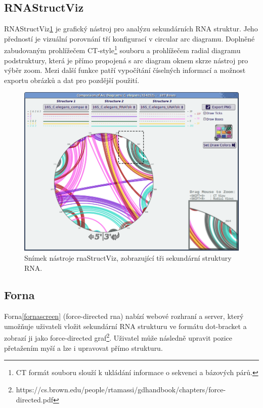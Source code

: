 \subsection{RNAStructViz} 

RNAStructViz\cite{RnaStructViz}\ref{structviz} je grafický nástroj pro analýzu sekundárních
RNA struktur. Jeho předností je vizuální porovnání tří konfigurací v circular
arc diagramu. Doplněné zabudovaným prohlížečem CT-style\footnote{CT formát
souboru slouží k ukládání informace o sekvenci a bázových párů.} souboru a
prohlížečem radial diagramu podstruktury, která je přímo propojená s arc
diagram oknem skrze nástroj pro výběr zoom. Mezi další funkce patří vypočítání
číselných informací a možnost exportu obrázků a dat pro pozdější použití.

\begin{figure}[H]
  \centering
  \includegraphics[width=140mm]{../img/kap01/tools/rnaStructViz.png}
  \caption[Snímek nástroje rnaStructViz]{Snímek nástroje rnaStructViz,
  zobrazující tři sekundární struktury RNA.\protect\footnotemark}
  \label{structviz}
\end{figure}


\subsection{Forna} 

Forna\cite{Forna}\ref{fornascreen} (force-directed rna) nabízí webové rozhraní
a server, který umožňuje uživateli vložit sekundární RNA strukturu ve formátu
dot-bracket a zobrazí ji jako force-directed
graf\footnote{https://cs.brown.edu/people/rtamassi/gdhandbook/chapters/force-directed.pdf}.
Uživatel může následně upravit pozice přetažením myší a lze i upravovat přímo
strukturu. 

